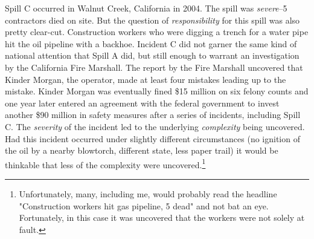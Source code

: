 \documentclass[12pt, man, natbib]{apa6}
\begin{document}
	Spill C occurred in Walnut Creek, California in 2004. The spill was \textit{severe}--5 contractors died on site. But the question of \textit{responsibility} for this spill was also pretty clear-cut. Construction workers who were digging a trench for a water pipe hit the oil pipeline with a backhoe. Incident C did not garner the same kind of national attention that Spill A did, but still enough to warrant an investigation by the California Fire Marshall. The report by the Fire Marshall uncovered that Kinder Morgan, the operator, made at least four mistakes leading up to the mistake. Kinder Morgan was eventually fined \$15 million on six felony counts and one year later entered an agreement with the federal government to invest another \$90 million in safety measures after a series of incidents, including Spill C. The \textit{severity} of the incident led to the underlying \textit{complexity} being uncovered. Had this incident occurred under slightly different circumstances (no ignition of the oil by a nearby blowtorch, different state, less paper trail) it would be thinkable that less of the complexity were uncovered.\footnote{Unfortunately, many, including me, would probably read the headline "Construction workers hit gas pipeline, 5 dead" and not bat an eye. Fortunately, in this case it was uncovered that the workers were not solely at fault.}	
	
%	
	


\end{document}
